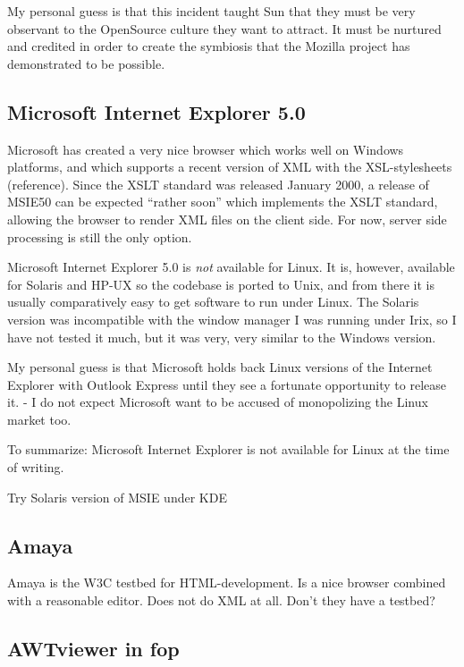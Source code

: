 My personal guess is that this incident taught Sun that they must be
very observant to the OpenSource culture they want to attract.  It
must be nurtured and credited in order to create the symbiosis that
the Mozilla project has demonstrated to be possible.

\subsection{Microsoft Internet Explorer 5.0}
\label{sec:microsoft-internet-explorer}

Microsoft has created a very nice browser which works well on Windows
platforms, and which supports a recent version of XML with the
XSL-stylesheets (\textsf{reference)}.  Since the XSLT standard was
released January 2000, a release of MSIE50 can be expected ``rather
soon'' which implements the XSLT standard, allowing the browser to
render XML files on the client side.  For now, server side processing
is still the only option.

Microsoft Internet Explorer 5.0 is \textit{not} available for Linux.
It is, however, available for Solaris and HP-UX so the codebase is
ported to Unix, and from there it is usually comparatively easy to get
software to run under Linux.  The Solaris version was incompatible
with the window manager I was running under Irix, so I have not tested
it much, but it was very, very similar to the Windows version.

My personal guess is that Microsoft holds back Linux versions of the
Internet Explorer with Outlook Express until they see a fortunate
opportunity to release it.   - I do not expect Microsoft want to be accused of
monopolizing the Linux market too.

To summarize:  Microsoft Internet Explorer is not available for Linux
at the time of writing.

\textsf{Try Solaris version of MSIE under KDE}

\subsection{Amaya}
\label{sec:amaya}

Amaya is the W3C testbed for HTML-development.  Is a nice browser
combined with a reasonable editor.  \textsf{Does not do XML at all}.
\textsf{Don't they have a testbed?}

\subsection{AWTviewer in fop}
\label{sec:awtviewer}

